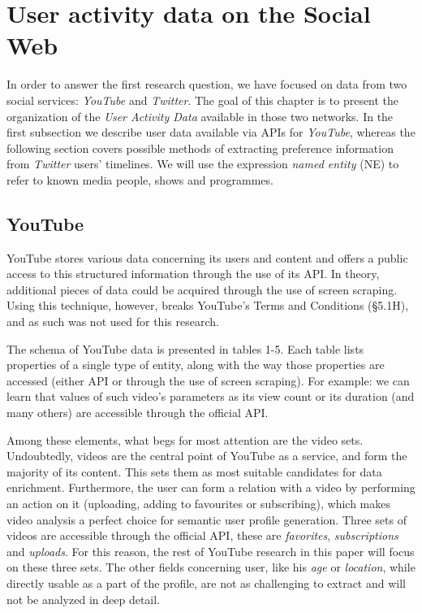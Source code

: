 \section{User activity data on the Social Web} 
In order to answer the first research question, we have focused on data from two social services: \textit{YouTube} and
\textit{Twitter}. The goal of this chapter is to present the organization of the \textit{User Activity Data} available
in those two networks. In the first subsection we describe user data available via APIs for
\textit{YouTube}, whereas the following section covers possible methods of extracting preference information from \textit{Twitter} users' timelines. We will use the expression \textit{named entity} (NE) to refer to
known media people, shows and programmes.

\subsection{YouTube}

YouTube stores various data concerning its users and content and offers a public
access to this structured information through the use of its API. In theory, additional
pieces of data could be acquired through the use of screen scraping. Using this
technique, however, breaks YouTube's Terms and Conditions (\S 5.1H), and as such
was not used for this research.

The schema of YouTube data is presented in tables 1-5.  Each table lists
properties of a single type of entity, along with the way those properties are
accessed (either API or through the use of screen scraping). For example:
we can learn that values of such video's parameters as its view count or
its duration (and many others) are accessible through the official API.

Among these elements, what begs for most attention are the video sets.
Undoubtedly, videos are the central point of YouTube as a service, and form the
majority of its content. This sets them as most suitable candidates for data
enrichment. Furthermore, the user can form a relation with a video by performing
an action on it (uploading, adding to favourites or subscribing), which makes
video analysis a perfect choice for semantic user profile generation.  Three
sets of videos are accessible through the official API, these are
\emph{favorites}, \emph{subscriptions} and \emph{uploads}. For this reason, the
rest of YouTube research in this paper will focus on these three sets. The other
fields concerning user, like his \textit{age} or \textit{location}, while
directly usable as a part of the profile, are not as challenging to extract and
will not be analyzed in deep detail.

